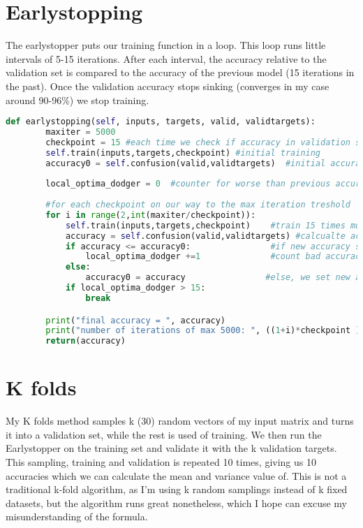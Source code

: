 \documentclass[10pt, a4paper]{article}
\begin{document}
\section{Earlystopping}
The earlystopper puts our training function in a loop.
This loop runs little intervals of 5-15 iterations.
After each interval, the accuracy relative to the validation set is compared to the accuracy of the previous model (15 iterations in the past).
Once the validation accuracy stops sinking (converges in my case around 90-96\%) we stop training.
\begin{lstlisting}[language = Python]
def earlystopping(self, inputs, targets, valid, validtargets):
        maxiter = 5000
        checkpoint = 15 #each time we check if accuracy in validation set is failing
        self.train(inputs,targets,checkpoint) #initial training
        accuracy0 = self.confusion(valid,validtargets)  #initial accuracy
        
        local_optima_dodger = 0  #counter for worse than previous accuracies
        
        #for each checkpoint on our way to the max iteration treshold
        for i in range(2,int(maxiter/checkpoint)):  
            self.train(inputs,targets,checkpoint)    #train 15 times more
            accuracy = self.confusion(valid,validtargets) #calcualte accuracy
            if accuracy <= accuracy0:                #if new accuracy sucks
                local_optima_dodger +=1              #count bad accuracy development
            else:
                accuracy0 = accuracy                #else, we set new accuracy to best 
            if local_optima_dodger > 15:            
                break   

        print("final accuracy = ", accuracy)
        print("number of iterations of max 5000: ", ((1+i)*checkpoint ))
        return(accuracy)
\end{lstlisting}
\clearpage

\section{K folds}
My K folds method samples k (30) random vectors of my input matrix and turns it into a validation set, while the rest is used of training.
We then run the Earlystopper on the training set and validate it with the k validation targets.
This sampling, training and validation is repeated 10 times, giving us 10 accuracies which we can calculate the mean and variance value of.
This is not a traditional k-fold algorithm, as I'm using k random samplings instead of k fixed datasets, but the algorithm runs great nonetheless, which I hope can excuse my misunderstanding of the formula.
\end{document}
